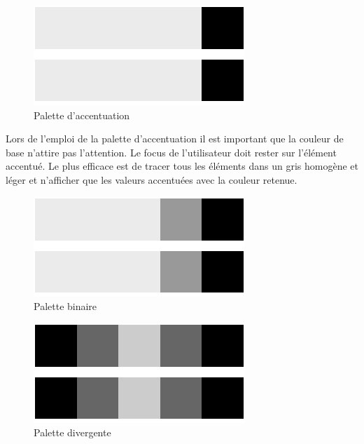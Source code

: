 \documentclass[a4paper,12pt]{article}
\begin{document}
\begin{multicols}{2}
\begin{figure}[H]
\centering
\includegraphics[width=.9\linewidth]{./img/palette-evidence.pdf}
\caption{\label{fig:org11f1545}Palette d'accentuation}
\end{figure}

Lors de l'emploi de la palette d'accentuation il est important que la couleur de base n'attire pas l'attention. Le focus de l'utilisateur doit rester sur l'élément accentué.\autocite{wilkeColorScales2019}
Le plus efficace est de tracer tous les éléments dans un gris homogène et léger et n'afficher que les valeurs accentuées avec la couleur retenue. \autocite{wilkeColorScales2019}

\begin{figure}[H]
\centering
\includegraphics[width=.9\linewidth]{./img/palette-binaire.pdf}
\caption{\label{fig:orge178b40}Palette binaire}
\end{figure}


\begin{figure}[H]
\centering
\includegraphics[width=.9\linewidth]{./img/palette-divergente.pdf}
\caption{\label{fig:orgd565538}Palette divergente}
\end{figure}


\end{multicols}
\end{document}
